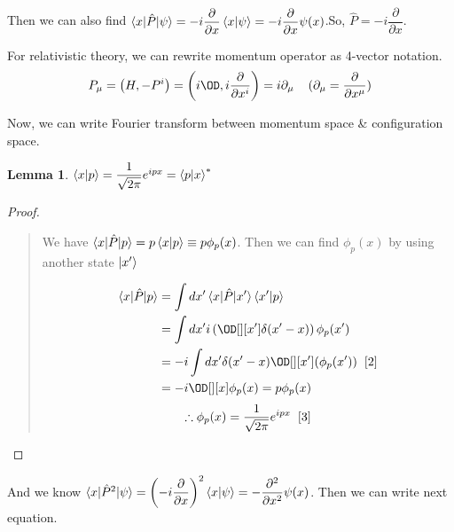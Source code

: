 \documentclass[final]{IEEEphot}
\newtheorem{lemma}{Lemma}[section]
\newcommand{\PD}[2]{\dfrac{\partial #1}{\partial #2}} %
\newcommand{\PPD}[2]{\dfrac{\partial^2 #1}{\partial #2 ^2}}
\newcommand{\hP}{\hat{P}}
\newcommand{\BKS}[1]{\left( #1 \right)} %
\newcommand{\HS}{\hspace{0.3cm}} %
\newcommand{\VS}{\vspace{0.3cm}} %
\newcommand{\hs}{\hspace{0.1cm}} %
\newcommand{\vs}{\vspace{0.1cm}} %
\begin{document}
Then we can also find $\braket{x|\hP|\psi} = -i \PD{}{x} \braket{x|\psi} = -i \PD{}{x} \psi(x)$.\hs\hs So, $\hP = -i\PD{}{x}$.

\VS
\vs

For relativistic theory, we can rewrite momentum operator as 4-vector notation.\footnotemark[1] 
\begin{equation}
 P_\mu = \BKS{H, -P^i} = \BKS{i\OD, i\PD{}{x^i}} = i\partial_\mu \HS\hs (\partial_\mu = \PD{}{x^{\mu}})
\end{equation}

\VS
\vs

Now, we can write Fourier transform between momentum space \& configuration space.

\VS

\begin{lemma}
 $\braket{x|p} = \dfrac{1}{\sqrt{2\pi}} e^{ipx} = \braket{p|x}^*$
\end{lemma}

\begin{proof}
 \begin{quote}
  We have $\braket{x|\hP|p} = p\braket{x|p} \equiv p \phi_p (x)$. Then we can find $\phi_p(x)$ by using another state $\ket{x'}$
  
  \begin{equation*}
   \begin{split}
    \braket{x|\hP|p} &= \int dx' \braket{x|\hP|x'} \braket{x'|p} \\
                     &= \int dx' i\BKS{\OD[][x'] \delta(x'-x)}\phi_p(x') \\
                     &= -i \int dx' \delta(x'-x) \OD[][x'] (\phi_p(x')) \hs\hs \footnotemark[2]\\
                     &= -i \OD[][x] \phi_p(x) = p\phi_p(x)
   \end{split}
  \end{equation*}
  \begin{equation}
   \therefore \phi_p(x) = \frac{1}{\sqrt{2\pi}} e^{ipx} \hs \hs \footnotemark[3]
  \end{equation}
  
 \end{quote}
\end{proof}

\vs

And we know $\braket{x|\hP^2|\psi} = \BKS{-i\PD{}{x}}^2 \braket{x|\psi} = - \PPD{}{x} \psi(x)$. Then we can write next equation.
\end{document}
